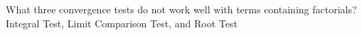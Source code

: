 {What three convergence tests do not work well with terms containing factorials?
}
{Integral Test, Limit Comparison Test, and Root Test
}